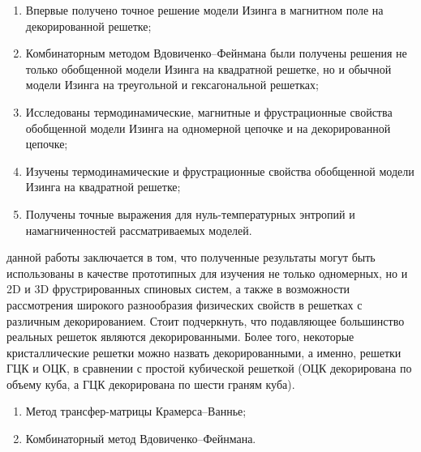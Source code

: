 {\novelty}
\begin{enumerate}[beginpenalty=10000] %
  \item Впервые получено точное решение модели Изинга в магнитном поле на декорированной решетке;
  \item Комбинаторным методом Вдовиченко--Фейнмана были получены решения не только обобщенной модели Изинга на квадратной решетке, но и обычной модели Изинга на треугольной и гексагональной решетках;
  \item Исследованы термодинамические, магнитные и фрустрационные свойства обобщенной модели Изинга на одномерной цепочке и на декорированной цепочке;
  \item Изучены термодинамические и фрустрационные свойства обобщенной модели Изинга на квадратной решетке;
  \item Получены точные выражения для нуль-температурных энтропий и намагниченностей рассматриваемых моделей.
\end{enumerate}

{\influence} данной работы заключается в том, что полученные результаты могут быть использованы в качестве прототипных для изучения не только одномерных, но и 2D и 3D фрустрированных спиновых систем, а также в возможности рассмотрения широкого разнообразия физических свойств в решетках с различным декорированием. Стоит подчеркнуть, что подавляющее большинство реальных решеток являются декорированными. Более того, некоторые кристаллические решетки можно назвать декорированными, а именно, решетки ГЦК и ОЦК, в сравнении с простой кубической решеткой (ОЦК декорирована по объему куба, а ГЦК декорирована по шести граням куба).

{\methods}
\begin{enumerate}[beginpenalty=10000] 
  \item Метод трансфер-матрицы Крамерса--Ваннье;
  \item Комбинаторный метод Вдовиченко--Фейнмана.
\end{enumerate}

